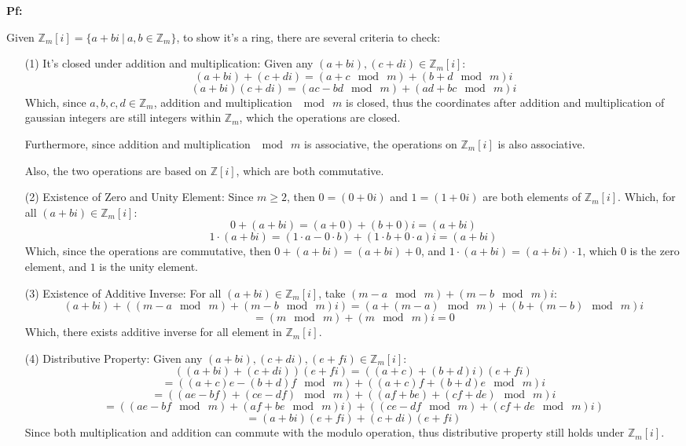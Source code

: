 \documentclass{article}
\begin{document}
\textbf{Pf:}

Given $\mathbb{Z}_m[i]=\{a+bi\ |\ a,b\in\mathbb{Z}_m\}$, to show it's a ring, there are several criteria to check:

\begin{itemize}
    \item[(1)] It's closed under addition and multiplication: Given any $(a+bi),(c+di)\in \mathbb{Z}_m[i]$:
    $$(a+bi)+(c+di)=(a+c \mod\ m)+(b+d \mod\ m)i$$
    $$(a+bi)(c+di)=(ac-bd \mod\ m)+(ad+bc \mod\ m)i$$
    Which, since $a,b,c,d\in \mathbb{Z}_m$, addition and multiplication $\mod\ m$ is closed, thus the coordinates 
    after addition and multiplication of gaussian integers are still integers within $\mathbb{Z}_m$, which the operations are closed.

    Furthermore, since addition and multiplication $\mod\ m$ is associative, the operations on $\mathbb{Z}_m[i]$ is also associative.

    Also, the two operations are based on $\mathbb{Z}[i]$, which are both commutative.

    \hfill

    \item[(2)] Existence of Zero and Unity Element: Since $m\geq 2$, then $0=(0+0i)$ and $1=(1+0i)$ are both elements of $\mathbb{Z}_m[i]$.
    Which, for all $(a+bi)\in \mathbb{Z}_m[i]$:
    $$0+(a+bi)=(a+0)+(b+0)i=(a+bi)$$
    $$1\cdot (a+bi)=(1\cdot a-0\cdot b)+(1\cdot b+0\cdot a)i = (a+bi)$$
    Which, since the operations are commutative, then $0+(a+bi)=(a+bi)+0$, and $1\cdot (a+bi)=(a+bi)\cdot 1$,
    which $0$ is the zero element, and $1$ is the unity element.

    \hfill

    \item[(3)] Existence of Additive Inverse: For all $(a+bi)\in\mathbb{Z}_m[i]$, take $(m-a \mod\ m)+(m-b \mod\ m)i$:
    $$(a+bi)+((m-a \mod\ m)+(m-b \mod\ m)i) = (a+(m-a) \mod\ m)+(b+(m-b) \mod\ m)i$$
    $$= (m \mod\ m)+(m \mod\ m)i = 0$$
    Which, there exists additive inverse for all element in $\mathbb{Z}_m[i]$.

    \hfill

    \item[(4)] Distributive Property: Given any $(a+bi), (c+di), (e+fi)\in\mathbb{Z}_m[i]$:
    $$((a+bi)+(c+di))(e+fi) = ((a+c)+(b+d)i)(e+fi)$$
    $$= ((a+c)e-(b+d)f \mod\ m)+((a+c)f+(b+d)e \mod\ m)i $$
    $$= ((ae-bf)+(ce-df)\mod\ m)+((af+be)+(cf+de)\mod\ m)i$$
    $$= ((ae-bf\mod\ m)+(af+be\mod\ m)i)+((ce-df\mod\ m)+(cf+de\mod\ m)i)$$
    $$ = (a+bi)(e+fi)+(c+di)(e+fi)$$
    Since both multiplication and addition can commute with the modulo operation, thus distributive property still holds
    under $\mathbb{Z}_m[i]$.
\end{itemize}
\end{document}
